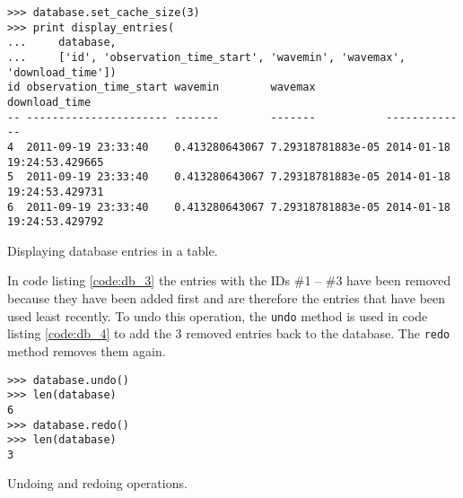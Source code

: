\begin{listing}[H]
\begin{verbatim}
>>> database.set_cache_size(3)
>>> print display_entries(
...     database,
...     ['id', 'observation_time_start', 'wavemin', 'wavemax', 'download_time'])
id observation_time_start wavemin        wavemax           download_time             
-- ---------------------- -------        -------           -------------             
4  2011-09-19 23:33:40    0.413280643067 7.29318781883e-05 2014-01-18 19:24:53.429665
5  2011-09-19 23:33:40    0.413280643067 7.29318781883e-05 2014-01-18 19:24:53.429731
6  2011-09-19 23:33:40    0.413280643067 7.29318781883e-05 2014-01-18 19:24:53.429792
\end{verbatim}
\caption{Displaying database entries in a table.}
\label{code:db_3}
\end{listing}

In code listing \ref{code:db_3} the entries with the IDs \#1 -- \#3 have been
removed because they have been added first and are therefore the entries that
have been used least recently. To undo this operation, the \texttt{undo} method
is used in code listing \ref{code:db_4} to add the 3 removed entries back to
the database. The \texttt{redo} method removes them again.

\begin{listing}[H]
\begin{verbatim}
>>> database.undo()
>>> len(database)
6
>>> database.redo()
>>> len(database)
3
\end{verbatim}
\caption{Undoing and redoing operations.}
\label{code:db_4}
\end{listing}

